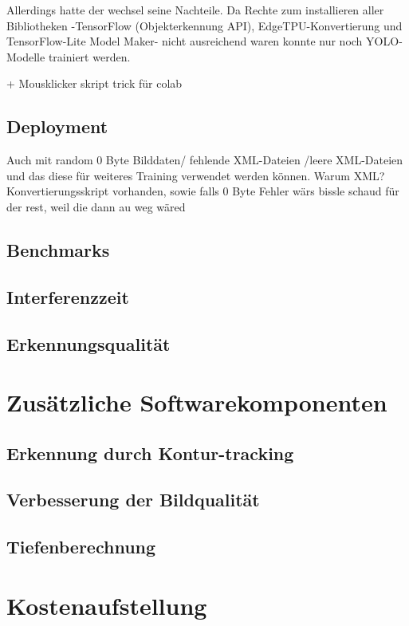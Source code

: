 Allerdings hatte der wechsel seine Nachteile. Da Rechte zum installieren aller Bibliotheken -TensorFlow (Objekterkennung API), EdgeTPU-Konvertierung und TensorFlow-Lite Model Maker- nicht ausreichend waren konnte nur noch \ac{YOLO}-Modelle trainiert werden.

+ Mousklicker skript trick für colab

\subsection{Deployment}

 Auch mit random 0 Byte Bilddaten/ fehlende XML-Dateien /leere XML-Dateien und das diese für weiteres Training verwendet werden können. Warum XML? Konvertierungsskript vorhanden, sowie falls 0 Byte Fehler wärs bissle schaud für der rest, weil die dann au weg wäred
\subsection{Benchmarks} \label{cap:Benchmarks}

\subsection{Interferenzzeit}

\subsection{Erkennungsqualität}

\section{Zusätzliche Softwarekomponenten}

\subsection{Erkennung durch Kontur-tracking}

\subsection{Verbesserung der Bildqualität}

\subsection{Tiefenberechnung} \label{cap:calc_depth}

\section{Kostenaufstellung}

